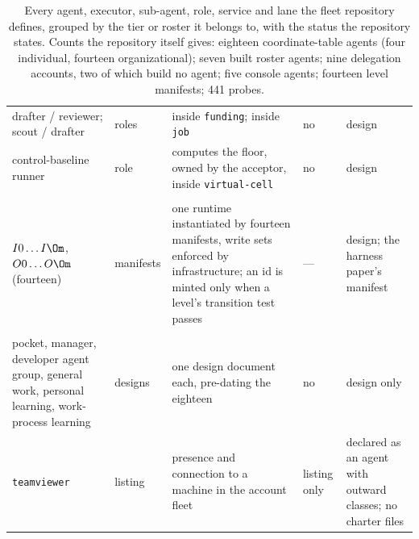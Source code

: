 \begin{table}[!htbp]
\begin{tabularx}{\textwidth}{@{}>{\raggedright\arraybackslash}p{3.6cm}>{\raggedright\arraybackslash}p{1.7cm}Y>{\raggedright\arraybackslash}p{1.2cm}>{\raggedright\arraybackslash}p{2.9cm}@{}}
drafter / reviewer; scout / drafter & roles & inside \texttt{funding}; inside \texttt{job} & no & design \\
control-baseline runner & role & computes the floor, owned by the acceptor, inside \texttt{virtual-cell} & no & design \\
\midrule
{} \\
$I0 \ldots I\Om$, $O0 \ldots O\Om$ (fourteen) & manifests & one runtime instantiated by fourteen manifests, write sets enforced by infrastructure; an id is minted only when a level's transition test passes & --- & design; the harness paper's manifest \\
\midrule
{} \\
pocket, manager, developer agent group, general work, personal learning, work-process learning & designs & one design document each, pre-dating the eighteen & no & design only \\
\texttt{teamviewer} & listing & presence and connection to a machine in the account fleet & listing only & declared as an agent with outward classes; no charter files \\
\bottomrule
\end{tabularx}
\caption{Every agent, executor, sub-agent, role, service and lane the fleet repository defines, grouped by the tier or roster it belongs to, with the status the repository states. Counts the repository itself gives: eighteen coordinate-table agents (four individual, fourteen organizational); seven built roster agents; nine delegation accounts, two of which build no agent; five console agents; fourteen level manifests; 441 probes.}
\label{tab:everyagent}
\end{table}

